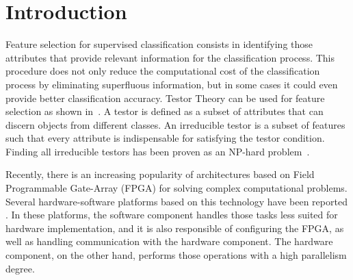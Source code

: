 \documentclass[authoryear,preprint,review,12pt]{elsarticle}
\begin{document}

\section{Introduction}
\label{sect:1}

Feature selection for supervised classification consists in identifying those attributes that 
provide relevant information for the classification process. This procedure does not only reduce the 
computational cost of the classification process by eliminating superfluous information, but in some cases 
it could even provide better classification accuracy. 
Testor Theory can be used for feature selection as shown in~\citep{R27,R5}. A testor is defined as a subset of attributes that can discern objects from different classes. An irreducible testor is a subset of features such that every attribute is indispensable for satisfying the testor condition. Finding all irreducible testors has been proven as an NP-hard problem~\citep{R40}.

Recently, there is an increasing popularity of architectures based on Field Programmable Gate-Array (FPGA) 
for solving complex computational problems. Several hardware-software platforms based on this technology have 
been reported \citep{R29,R30}. 
In these platforms, the software component handles those tasks less suited for hardware implementation, 
and it is also responsible of configuring the FPGA, as well as handling communication with the hardware component. 
The hardware component, on the other hand, performs those operations with a high parallelism degree.
\end{document}
